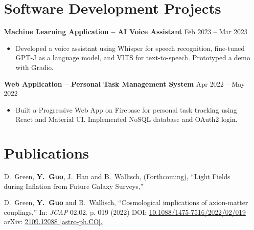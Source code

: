 \documentclass[letterpaper,12pt]{article}
\newenvironment{zitemize}{
\begin{itemize} \vspace{-.9em}\itemsep 0pt \parskip 0pt}
{\end{itemize}\vspace{-.5em}}
\newcommand{\proglang}[1]{#1}
\begin{document}
\section{Software Development Projects}
\textbf{Machine Learning Application -- AI Voice Assistant} \hfill Feb 2023 -- Mar 2023 \\
\begin{zitemize}
    \item Developed a voice assistant using \proglang{Whisper} for speech recognition, fine-tuned \proglang{GPT-J} as a language model, and \proglang{VITS} for text-to-speech. Prototyped a demo with \proglang{Gradio}.
\end{zitemize}

\textbf{Web Application -- Personal Task Management System} \hfill Apr 2022 -- May 2022 \\
\begin{zitemize}
    \item Built a Progressive Web App on \proglang{Firebase} for personal task tracking using \proglang{React} and \proglang{Material UI}. Implemented \proglang{NoSQL} database and \proglang{OAuth2} login.
\end{zitemize}


\section{Publications}

D.~Green, \textbf{Y.~Guo}, J.~Han and B.~Wallisch, (Forthcoming),
``Light Fields during Inflation from Future Galaxy Surveys,''

D.~Green, \textbf{Y.~Guo} and B.~Wallisch,
``Cosmological implications of axion-matter couplings,''
In: \textit{JCAP} 02.02, p. 019 (2022)
DOI: \href{https://iopscience.iop.org/article/10.1088/1475-7516/2022/02/019}{10.1088/1475-7516/2022/02/019}
arXiv: \href{https://arxiv.org/abs/2109.12088?context=hep-ph}{2109.12088 [astro-ph.CO].}
\end{document}
